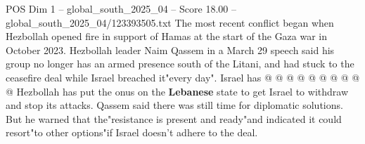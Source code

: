 \begin{textsample}{POS Dim 1 – global\_south\_2025\_04 – Score 18.00 – global\_south\_2025\_04/123393505.txt}
The most recent conflict began when Hezbollah opened fire in support of Hamas at the start of the Gaza war in October 2023.
Hezbollah leader Naim Qassem in a March 29 speech said his group no longer has an armed presence south of the Litani, and had stuck to the ceasefire deal while Israel breached it"every day".
Israel has @ @ @ @ @ @ @ @ @ @ Hezbollah has put the onus on the \textbf{Lebanese} state to get Israel to withdraw and stop its attacks.
Qassem said there was still time for diplomatic solutions.
But he warned that the"resistance is present and ready"and indicated it could resort"to other options"if Israel doesn't adhere to the deal.

\end{textsample}
